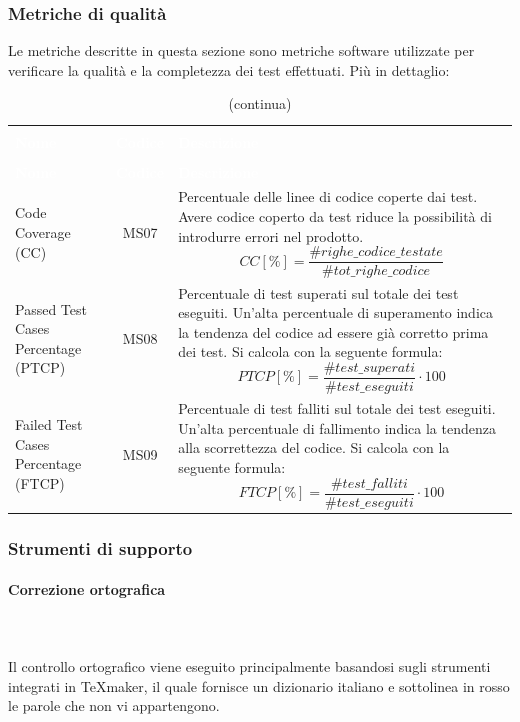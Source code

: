 \subsubsection{Metriche di qualità} \label{sez:meVe}
Le metriche descritte in questa sezione sono metriche software utilizzate per verificare la qualità e la completezza dei test effettuati. Più in dettaglio:
\begin{longtable}{ C{4.5cm} c L{9.5cm} }
	\caption{Metriche per la qualità e completezza dei test}\\
		\textcolor{white}{\textbf{Nome}} & \textcolor{white}{\textbf{Codice}} & \centerline{\textcolor{white}{\textbf{Descrizione}}} \\
		\endfirsthead
		\caption[]{(continua)} \\
		\textcolor{white}{\textbf{Nome}} & \textcolor{white}{\textbf{Codice}} & \centerline{\textcolor{white}{\textbf{Descrizione}}} \\
		\endhead
		Code Coverage (CC) & MS07 & Percentuale delle linee di codice coperte dai test. Avere codice coperto da test riduce la possibilità di introdurre errori nel prodotto. 
		\[ CC[\%] = \frac{\#righe\_codice\_testate}{\#tot\_righe\_codice}\] \\
		Passed Test Cases Percentage (PTCP) & MS08 & Percentuale di test superati sul totale dei test eseguiti. Un'alta percentuale di superamento indica la tendenza del codice ad essere già corretto prima dei test. Si calcola con la seguente
formula:
		\[ PTCP[\%] = \frac{\#test\_superati}{\#test\_eseguiti}\cdot 100 \] \\
		Failed Test Cases Percentage (FTCP) & MS09 & Percentuale di test falliti sul totale dei test eseguiti. Un'alta percentuale di fallimento indica la tendenza
alla scorrettezza del codice. Si calcola con la seguente formula:
\[ FTCP[\%] = \frac{\#test\_falliti}{\#test\_eseguiti}\cdot 100 \] \\
\end{longtable}

\subsubsection{Strumenti di supporto}

\paragraph{Correzione ortografica} \mbox{} \\ \mbox{} \\
Il controllo ortografico viene eseguito principalmente basandosi sugli strumenti integrati in \TeX{}maker, il quale fornisce un dizionario italiano e sottolinea in rosso le parole che non vi appartengono. 

